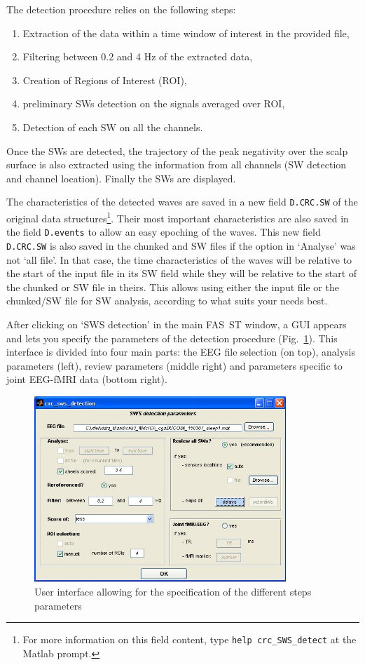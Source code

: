\documentclass[a4paper,titlepage]{article}
\def\dblS{\hbox{S\hskip -4.5pt S}}
\newcommand{\fasst}{FA\dblS T } 	%
\begin{document}
The detection procedure relies on the following steps:
\begin{enumerate}
\item Extraction of the data within a time window of interest in the provided file,
\item Filtering between 0.2 and 4 Hz of the extracted data,
\item Creation of Regions of Interest (ROI),
\item preliminary SWs detection on the signals averaged over ROI,
\item Detection of each SW on all the channels.
\end{enumerate}
Once the SWs are detected, the trajectory of the peak negativity  over the scalp surface is also extracted using the information from all channels (SW detection and channel location). Finally the SWs are displayed.

The characteristics of the detected waves are saved in a new field {\tt D.CRC.SW} of the original data structures\footnote{For more information on this field content, type  {\tt help crc\_SWS\_detect} at the Matlab prompt.}. Their most important characteristics are also saved in the field {\tt D.events} to allow an easy epoching of the waves. This  new field {\tt D.CRC.SW} is also saved in the chunked and SW files if the option in `Analyse' was not `all file'. In that case, the time characteristics of the waves will be relative to the start of the input file in its SW field while they will be relative to the start of the chunked or SW file in theirs. This allows using either the input file or the chunked/SW file for SW analysis, according to what suits your needs best.

After clicking on `SWS detection' in the main \fasst window, a GUI appears and lets you specify the parameters of the detection procedure (Fig.~\ref{fig:sws_detect_gui}).
This interface is divided into four main parts: the EEG file selection (on top), analysis parameters (left), review parameters (middle right) and parameters specific to joint EEG-fMRI data (bottom right).
\begin{figure}[ht]
	\centering
		\includegraphics[height=7cm]{images/FIG14_SWS_gui.JPG}
	\caption{User interface allowing for the specification of the different steps parameters
	\label{fig:sws_detect_gui}}
\end{figure}
\end{document}
